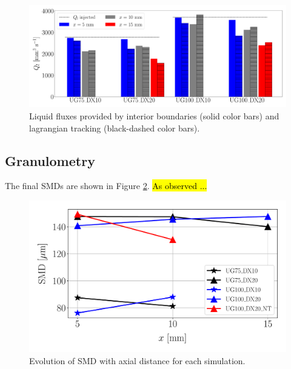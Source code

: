 \begin{figure}[ht]
	\centering
   \includegraphics[scale=0.225]{./part2_developments/figures_ch5_resolved_JICF/SPRAY_characterization/establishment_and_fluxes/fluxes_SLI_vs_IBs}
   \caption{Liquid fluxes provided by interior boundaries (solid color bars) and lagrangian tracking (black-dashed color bars).}
   \label{fig:fluxes_bargraph_IBs_vs_LGS}
\end{figure}


\subsection{Granulometry}



The final SMDs are shown in Figure \ref{fig:ch5_spray_char_SMD_final}. \hl{As observed ...}


\begin{figure}[ht]
\centering
   \includegraphics[scale=0.30]{./part2_developments/figures_ch5_resolved_JICF/SPRAY_characterization/SMD_values}
   \vspace*{-0.2in}
   \caption{Evolution of SMD with axial distance for each simulation.}
   \label{fig:ch5_spray_char_SMD_final}
\end{figure}


